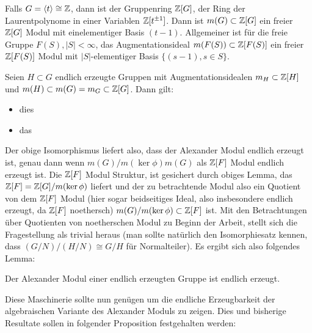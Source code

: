 \begin{bsp}
	Falls $G=\langle t \rangle \cong \mathbb{Z}$, dann ist der Gruppenring $\mathbb{Z} [G]$, der Ring der Laurentpolynome in einer Variablen $\mathbb{Z}[t^{\pm 1}]$. Dann ist $m(G) \subset \mathbb{Z}[G]$ ein freier $\mathbb{Z}[G]$ Modul mit einelementiger Basis $(t-1)$. Allgemeiner ist für die freie Gruppe $F(S), |S| < \infty$, das Augmentationsideal $m(F(S)) \subset \mathbb{Z}[F(S)]$ ein freier $\mathbb{Z}[F(S)]$ Modul mit $|S|$-elementiger Basis $\{(s-1), s \in S\}$.
\end{bsp}

\begin{lem}[Augmentationsideale]
	Seien $H\subset G$ endlich erzeugte Gruppen mit Augmentationsidealen $m_H\subset \mathbb{Z}[H]$ und $m(H)\subset m(G)=m_G\subset \mathbb{Z}[G]$. Dann gilt:
	\begin{itemize}
		\item dies
		\item das
	\end{itemize}
\end{lem}
Der obige Isomorphismus liefert also, dass der Alexander Modul endlich erzeugt ist, genau dann wenn $m(G)/m(\ker\phi)m(G)$ als $\mathbb{Z}[F]$ Modul endlich erzeugt ist. Die $\mathbb{Z}[F]$ Modul Struktur, ist gesichert durch obiges Lemma, das $\mathbb{Z}[F]=\mathbb{Z}[G]/m(\ker\phi)$ liefert und der zu betrachtende Modul also ein Quotient von dem $\mathbb{Z}[F]$ Modul (hier sogar beidseitiges Ideal, also insbesondere endlich erzeugt, da $\mathbb{Z}[F]$ noethersch) $m(G)/m(\ker\phi) \subset \mathbb{Z}[F]$ ist. Mit den Betrachtungen über Quotienten von noetherschen Modul zu Beginn der Arbeit, stellt sich die Fragestellung als trivial heraus (man sollte natürlich den Isomorphiesatz kennen, dass $(G/N)/(H/N)\cong G/H$ für Normalteiler). Es ergibt sich also folgendes Lemma:

\begin{lem}
	Der Alexander Modul einer endlich erzeugten Gruppe ist endlich erzeugt.
\end{lem}



Diese Maschinerie sollte nun genügen um die endliche Erzeugbarkeit der algebraischen Variante des Alexander Moduls zu zeigen. Dies und bisherige Resultate sollen in folgender Proposition festgehalten werden:

